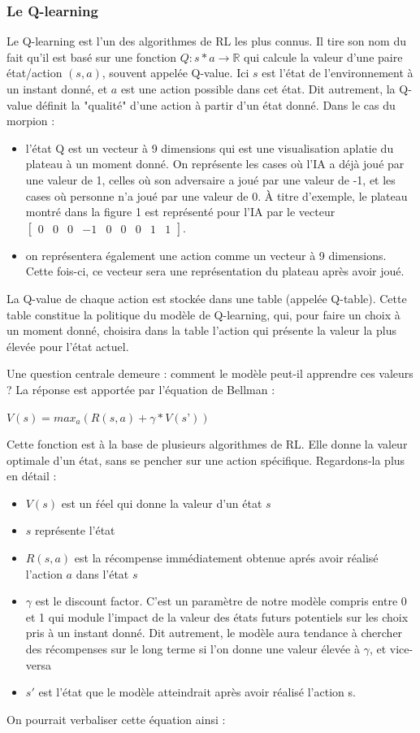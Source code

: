\documentclass[french]{article}
\begin{document}
    \subsubsection{Le Q-learning}
    Le Q-learning est l'un des algorithmes de RL les plus connus. Il tire son nom du fait qu'il est basé sur une fonction $Q:s * a \rightarrow \mathbb{R}$ qui calcule la valeur d'une paire état/action $(s, a)$, souvent appelée Q-value. Ici $s$ est l'état de l'environnement à un instant donné, et $a$ est une action possible dans cet état. Dit autrement, la Q-value définit la "qualité" d'une action à partir d'un état donné. Dans le cas du morpion :
    \begin{itemize}
        \item l'état Q est un vecteur à 9 dimensions qui est une visualisation aplatie du plateau à un moment donné. On représente les cases où l'IA a déjà joué par une valeur de 1, celles où son adversaire a joué par une valeur de -1, et les cases où personne n'a joué par une valeur de 0. À titre d'exemple, le plateau montré dans la figure 1 est représenté pour l'IA par le vecteur $\begin{bmatrix}0&0&0&-1&0&0&0&1&1\end{bmatrix}$.
        \item on représentera également une action comme un vecteur à 9 dimensions. Cette fois-ci, ce vecteur sera une représentation du plateau après avoir joué.
    \end{itemize}

    La Q-value de chaque action est stockée dans une table (appelée Q-table). Cette table constitue la politique du modèle de Q-learning, qui, pour faire un choix à un moment donné, choisira dans la table l'action qui présente la valeur la plus élevée pour l'état actuel.

    Une question centrale demeure : comment le modèle peut-il apprendre ces valeurs ? La réponse est apportée par l'équation de Bellman :


    {\centering $V(s)=max_a(R(s,a)+ \gamma*V(s’))$}
    

    Cette fonction est à la base de plusieurs algorithmes de RL. Elle donne la valeur optimale d'un état, sans se pencher sur une action spécifique. Regardons-la plus en détail :
    \begin{itemize}
        \item $V(s)$ est un ŕéel qui donne la valeur d'un état $s$
        \item $s$ représente l'état
        \item $R(s, a)$ est la récompense immédiatement obtenue aprés avoir réalisé l'action $a$ dans l'état $s$
        \item $\gamma$ est le discount factor. C'est un paramètre de notre modèle compris entre 0 et 1 qui module l'impact de la valeur des états futurs potentiels sur les choix pris à un instant donné. Dit autrement, le modèle aura tendance à chercher des récompenses sur le long terme si l'on donne une valeur élevée à $\gamma$, et vice-versa
        \item $s'$ est l'état que le modèle atteindrait après avoir réalisé l'action s.
    \end{itemize}
    On pourrait verbaliser cette équation ainsi :
\end{document}
